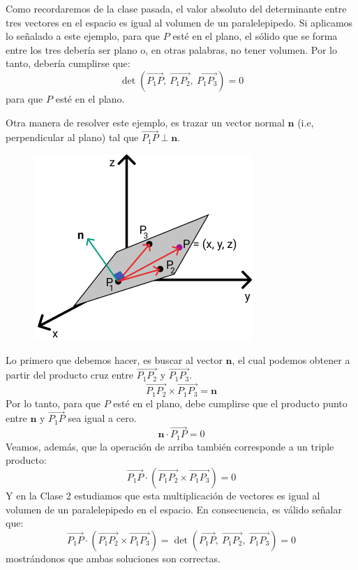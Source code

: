 \documentclass[12pt]{article}
\begin{document}
Como recordaremos de la clase pasada, el valor absoluto del determinante entre tres vectores en el espacio es igual al volumen de un paralelepipedo. Si aplicamos lo señalado a este ejemplo, para que $P$ esté en el plano, el sólido que se forma entre los tres debería ser plano o, en otras palabras, no tener volumen. Por lo tanto, debería cumplirse que:
\[
  \det(\overrightarrow{P_{1}P}, \ \overrightarrow{P_{1}P_{2}}, \ \overrightarrow{P_{1}P_{3}}) = 0
\]
para que $P$ esté en el plano.

Otra manera de resolver este ejemplo, es trazar un vector normal $\mathbf{n}$ (i.e, perpendicular al plano) tal que $\overrightarrow{P_{1}P} \perp \mathbf{n}$.

\begin{figure}[hbt!]
\centering
\includegraphics[scale=0.6]{img/ex-determ-cross-prod-3.jpg}
\end{figure}

Lo primero que debemos hacer, es buscar al vector $\mathbf{n}$, el cual podemos obtener a partir del producto cruz entre $\overrightarrow{P_{1}P_{2}}$ y $\overrightarrow{P_{1}P_{3}}$.
\[
  \overrightarrow{P_{1}P_{2}} \times \overrightarrow{P_{1}P_{3}} = \mathbf{n}
\]
Por lo tanto, para que $P$ esté en el plano, debe cumplirse que el producto punto entre $\mathbf{n}$ y $\overrightarrow{P_{1}P}$ sea igual a cero.
\[
  \mathbf{n} \cdot \overrightarrow{P_{1}P} = 0
\]
Veamos, además, que la operación de arriba también corresponde a un triple producto:
\[
  \overrightarrow{P_{1}P} \cdot (\overrightarrow{P_{1}P_{2}} \times \overrightarrow{P_{1}P_{3}}) = 0
\]
Y en la Clase 2 estudiamos que esta multiplicación de vectores es igual al volumen de un paralelepipedo en el espacio. En consecuencia, es válido señalar que:
\[
  \overrightarrow{P_{1}P} \cdot (\overrightarrow{P_{1}P_{2}} \times \overrightarrow{P_{1}P_{3}}) =
    \det(\overrightarrow{P_{1}P}, \ \overrightarrow{P_{1}P_{2}}, \ \overrightarrow{P_{1}P_{3}}) = 0
\]
mostrándonos que ambas soluciones son correctas.
\end{document}
